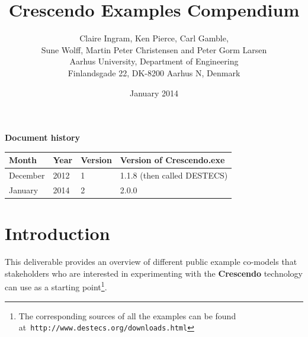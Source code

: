 \documentclass{crescendorepchap}
\newcommand{\DESTECS}{\textbf{Crescendo}\xspace}
\newcommand{\url}[1]{\texttt{#1}}
\begin{document}
\title{Crescendo Examples Compendium}
\author{Claire Ingram, Ken Pierce, Carl Gamble, \\[5mm]
Sune Wolff, Martin Peter
Christensen and Peter Gorm Larsen\\
Aarhus University, Department of Engineering\\
Finlandsgade 22, DK-8200 Aarhus N, Denmark
}

\date{January 2014}


\maketitle

\frontmatter

\textbf{Document history}

\begin{tabular}{|l|l|l|l|}\hline
Month   & Year & Version & Version of Crescendo.exe \\ \hline
December& 2012 & 1       & 1.1.8 (then called DESTECS)  \\ \hline
January& 2014 & 2       & 2.0.0 \\ \hline
\end{tabular}

\cleardoublepage

%

\cleardoublepage


%

%


\tableofcontents


\mainmatter
\chapter{Introduction}\label{cha:intro}
This deliverable provides an overview of different public example
co-models that stakeholders who are interested in experimenting with
the \DESTECS technology can use as a starting point\footnote{The corresponding
sources of all the examples can be found
at~\url{http://www.destecs.org/downloads.html}}.
\end{document}
